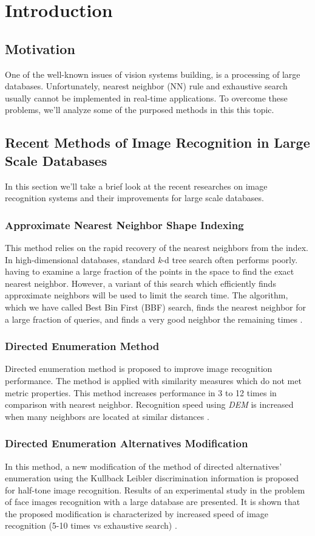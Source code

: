 \chapter{Introduction}

\section{Motivation}
One of the well-known issues of vision systems building, is a processing of
large databases. Unfortunately, nearest neighbor (NN) rule and exhaustive
search usually cannot be implemented in real-time applications\cite{motiv1}. To overcome these problems, we'll analyze some of the purposed methods in this this topic.

\section{Recent Methods of Image Recognition in Large Scale Databases}
In this section we'll take a brief look at the recent researches on image recognition systems and their improvements for large scale databases.

\subsection{Approximate Nearest Neighbor Shape Indexing}
This method relies on the rapid recovery of the nearest neighbors from the index. In high-dimensional databases, standard \textit{k}-d tree search often performs poorly.  having to examine a large fraction of the points in the space to find the exact nearest neighbor. However, a variant of this search which efficiently finds approximate neighbors will be used to limit the search time. The algorithm, which we have called Best
Bin First (BBF) search, finds the nearest neighbor for a
large fraction of queries, and finds a very good neighbor
the remaining times \cite{motiv2}.
	
\subsection{Directed Enumeration Method}
Directed enumeration method is proposed to improve image recognition performance. The method is applied with similarity measures which do not met metric properties. This method increases performance in 3 to 12 times in comparison with nearest neighbor. Recognition speed using \textit{DEM} is increased when many neighbors are located at similar distances \cite{motiv3}.

\subsection{Directed Enumeration Alternatives Modification}
In this method, a new modification of the method of directed alternatives’
enumeration using the Kullback Leibler discrimination information is proposed
for half-tone image recognition. Results of an experimental study in
the problem of face images recognition with a large database are presented.
It is shown that the proposed modification is characterized by increased
speed of image recognition (5-10 times vs exhaustive search) \cite{motiv4}.